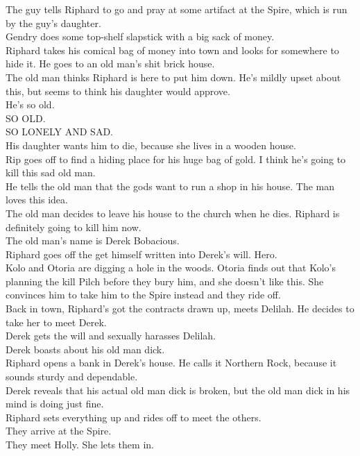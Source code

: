 The guy tells Riphard to go and pray at some artifact at the Spire, which is run by the guy’s daughter.\\
Gendry does some top-shelf slapstick with a big sack of money.\\
Riphard takes his comical bag of money into town and looks for somewhere to hide it. He goes to an old man’s shit brick house.\\
The old man thinks Riphard is here to put him down. He’s mildly upset about this, but seems to think his daughter would approve.\\
He’s so old.\\
SO OLD.\\
SO LONELY AND SAD.\\
His daughter wants him to die, because she lives in a wooden house.\\
Rip goes off to find a hiding place for his huge bag of gold. I think he’s going to kill this sad old man.\\
He tells the old man that the gods want to run a shop in his house. The man loves this idea.\\
The old man decides to leave his house to the church when he dies. Riphard is definitely going to kill him now.\\
The old man’s name is Derek Bobacious.\\
Riphard goes off the get himself written into Derek’s will. Hero.\\
Kolo and Otoria are digging a hole in the woods. Otoria finds out that Kolo’s planning the kill Pilch before they bury him, and she doesn’t like this. She convinces him to take him to the Spire instead and they ride off.\\
Back in town, Riphard’s got the contracts drawn up, meets Delilah. He decides to take her to meet Derek.\\
Derek gets the will and sexually harasses Delilah.\\
Derek boasts about his old man dick.\\
Riphard opens a bank in Derek’s house. He calls it Northern Rock, because it sounds sturdy and dependable.\\
Derek reveals that his actual old man dick is broken, but the old man dick in his mind is doing just fine.\\
Riphard sets everything up and rides off to meet the others.\\
They arrive at the Spire.\\
They meet Holly. She lets them in.\\

